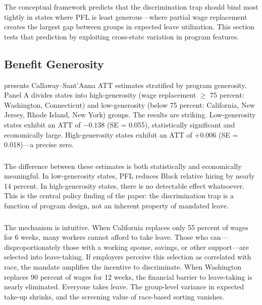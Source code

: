 \documentclass[12pt]{article}
\begin{document}
The conceptual framework predicts that the discrimination trap should bind most tightly in states where PFL is least generous---where partial wage replacement creates the largest gap between groups in expected leave utilization. This section tests that prediction by exploiting cross-state variation in program features.

\subsection{Benefit Generosity}

 presents Callaway--Sant'Anna ATT estimates stratified by program generosity. Panel A divides states into high-generosity (wage replacement $\geq$ 75 percent: Washington, Connecticut) and low-generosity (below 75 percent: California, New Jersey, Rhode Island, New York) groups. The results are striking. Low-generosity states exhibit an ATT of $-0.138$ (SE = 0.055), statistically significant and economically large. High-generosity states exhibit an ATT of $+0.006$ (SE = 0.018)---a precise zero.



\subsubsection*{}
The difference between these estimates is both statistically and economically meaningful. In low-generosity states, PFL reduces Black relative hiring by nearly 14 percent. In high-generosity states, there is no detectable effect whatsoever. This is the central policy finding of the paper: the discrimination trap is a function of program design, not an inherent property of mandated leave.

\subsubsection*{}
The mechanism is intuitive. When California replaces only 55 percent of wages for 6 weeks, many workers cannot afford to take leave. Those who can---disproportionately those with a working spouse, savings, or other support---are selected into leave-taking. If employers perceive this selection as correlated with race, the mandate amplifies the incentive to discriminate. When Washington replaces 90 percent of wages for 12 weeks, the financial barrier to leave-taking is nearly eliminated. Everyone takes leave. The group-level variance in expected take-up shrinks, and the screening value of race-based sorting vanishes.
\end{document}
